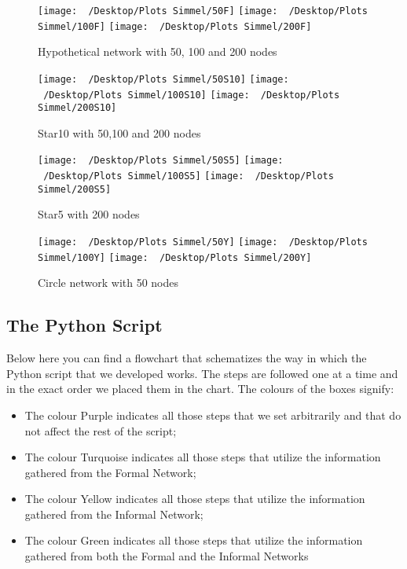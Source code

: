 \documentclass{article}
\begin{document}
\begin{figure}[h]
\centering
\texttt{[image: ~/Desktop/Plots Simmel/50F]}\hfill
\texttt{[image: ~/Desktop/Plots Simmel/100F]}\hfill
\texttt{[image: ~/Desktop/Plots Simmel/200F]}
\caption{Hypothetical network with 50, 100 and 200 nodes}
\end{figure}



\begin{figure}[h]
\centering
\texttt{[image: ~/Desktop/Plots Simmel/50S10]}\hfill
\texttt{[image: ~/Desktop/Plots Simmel/100S10]}\hfill
\texttt{[image: ~/Desktop/Plots Simmel/200S10]}
\caption{Star10 with 50,100 and 200 nodes}
\end{figure}

\begin{figure}[h]
\centering
\texttt{[image: ~/Desktop/Plots Simmel/50S5]}\hfill
\texttt{[image: ~/Desktop/Plots Simmel/100S5]}\hfill
\texttt{[image: ~/Desktop/Plots Simmel/200S5]}
\caption{Star5 with 200 nodes}
\end{figure}

\begin{figure}[h]
\centering
\texttt{[image: ~/Desktop/Plots Simmel/50Y]}\hfill
\texttt{[image: ~/Desktop/Plots Simmel/100Y]}\hfill
\texttt{[image: ~/Desktop/Plots Simmel/200Y]}
\caption{Circle network with 50 nodes}
\end{figure}

\newpage
\subsection{The Python Script}
Below here you can find a flowchart that schematizes the way in which the Python script that we developed works. The steps are followed one at a time and in the exact order we placed them in the chart. The colours of the boxes signify:
\begin{itemize}
	\item The colour Purple indicates all those steps that we set arbitrarily and that do not affect the rest of the script;
	\item The colour Turquoise indicates all those steps that utilize the information gathered from the Formal Network;
	\item The colour Yellow indicates all those steps that utilize the information gathered from the Informal Network;
	\item The colour Green indicates all those steps that utilize the information gathered from both the Formal and the Informal Networks
\end{itemize}
\end{document}
